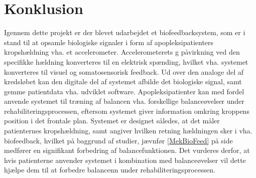 \section{Konklusion}
Igennem dette projekt er der blevet udarbejdet et biofeedbacksystem, som er i stand til at opsamle biologiske signaler i form af apopleksipatienters kropshældning vha. et accelerometer. Accelerometerets g påvirkning ved den specifikke hældning konverteres til en elektrisk spænding, hvilket vha. systemet konverteres til visuel og somatosensorisk feedback. Ud over den analoge del af kredsløbet kan den digitale del af systemet afbilde det biologiske signal, samt gemme patientdata vha. udviklet software. Apopleksipatienter kan med fordel anvende systemet til træning af balancen vha. forskellige balanceøvelser under rehabiliteringsprocessen, eftersom systemet giver information omkring kroppens position i det frontale plan. Systemet er designet således, at det måler patienternes kropshældning, samt angiver hvilken retning hældningen sker i vha. biofeedback, hvilket på baggrund af studier, jævnfør \ref{MekBioFeed} på side \pageref{MekBioFeed} medfører en signifikant forbedring af balancefunktionen. Det vurderes derfor, at hvis patienterne anvender systemet i kombination med balanceøvelser vil dette hjælpe dem til at forbedre balancenn under rehabiliteringsprocessen.  


